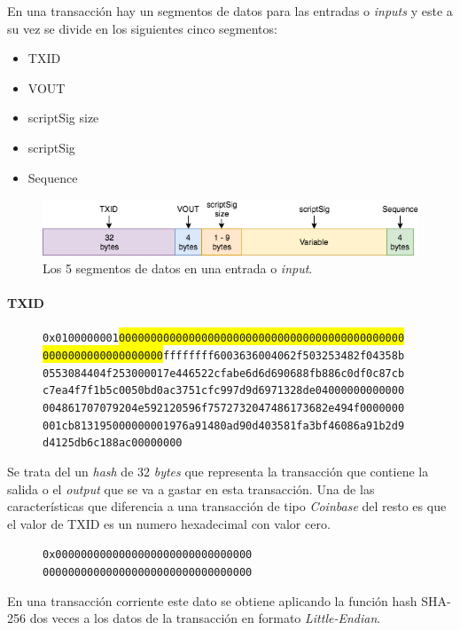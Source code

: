 \documentclass{article}
\begin{document}
    En una transacción hay un segmentos de datos para las entradas o \textit{inputs} y este a su vez se divide en los siguientes cinco segmentos:
    
    \begin{itemize}
    \item TXID
    \item VOUT
    \item scriptSig size
    \item scriptSig
    \item Sequence
    \end{itemize}
    
    \begin{figure}[H]
    \centering
        \includegraphics[scale=0.57]{img/Bitcoin_tansactions_data_input.png}
        \caption{Los 5 segmentos de datos en una entrada o \textit{input}.}
    \end{figure}
    
    \paragraph{TXID}
    
    \begin{figure}[H]
        \texttt{0x0100000001\colorbox{Yellow}{000000000000000000000000000000000000000000000}} \\
        \texttt{\colorbox{Yellow}{0000000000000000000}ffffffff6003636004062f503253482f04358b} \\
        \texttt{0553084404f253000017e446522cfabe6d6d690688fb886c0df0c87cb} \\
        \texttt{c7ea4f7f1b5c0050bd0ac3751cfc997d9d6971328de04000000000000} \\
        \texttt{004861707079204e592120596f7572732047486173682e494f0000000} \\
        \texttt{001cb813195000000001976a91480ad90d403581fa3bf46086a91b2d9} \\
        \texttt{d4125db6c188ac00000000}
    \end{figure}
    
    Se trata del un \textit{hash} de 32 \textit{bytes} que representa la transacción que contiene la salida o el \textit{output} que se va a gastar en esta transacción. Una de las características que diferencia a una transacción de tipo \textit{Coinbase} del resto es que el valor de TXID es un numero hexadecimal con valor cero.
    \begin{figure}[H]
        \texttt{0x0000000000000000000000000000000} \\
        \texttt{000000000000000000000000000000000}
    \end{figure}
    En una transacción corriente este dato se obtiene aplicando la función hash SHA-256 dos veces a los datos de la transacción en formato \textit{Little-Endian}.
    
\end{document}
